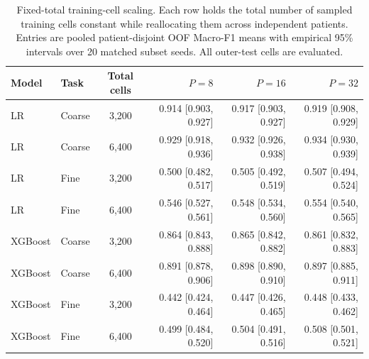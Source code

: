 \begin{table}[H]
\centering
\small
\setlength{\tabcolsep}{4pt}
\begin{tabular}{llcrrr}
\toprule
Model & Task & Total cells & $P=8$ & $P=16$ & $P=32$ \\
\midrule
LR & Coarse & 3,200 & 0.914 [0.903, 0.927] & 0.917 [0.903, 0.927] & 0.919 [0.908, 0.929] \\
LR & Coarse & 6,400 & 0.929 [0.918, 0.936] & 0.932 [0.926, 0.938] & 0.934 [0.930, 0.939] \\
LR & Fine & 3,200 & 0.500 [0.482, 0.517] & 0.505 [0.492, 0.519] & 0.507 [0.494, 0.524] \\
LR & Fine & 6,400 & 0.546 [0.527, 0.561] & 0.548 [0.534, 0.560] & 0.554 [0.540, 0.565] \\
\midrule
XGBoost & Coarse & 3,200 & 0.864 [0.843, 0.888] & 0.865 [0.842, 0.882] & 0.861 [0.832, 0.883] \\
XGBoost & Coarse & 6,400 & 0.891 [0.878, 0.906] & 0.898 [0.890, 0.910] & 0.897 [0.885, 0.911] \\
XGBoost & Fine & 3,200 & 0.442 [0.424, 0.464] & 0.447 [0.426, 0.465] & 0.448 [0.433, 0.462] \\
XGBoost & Fine & 6,400 & 0.499 [0.484, 0.520] & 0.504 [0.491, 0.516] & 0.508 [0.501, 0.521] \\
\midrule
\bottomrule
\end{tabular}
\caption{Fixed-total training-cell scaling. Each row holds the total number of sampled training cells constant while reallocating them across independent patients. Entries are pooled patient-disjoint OOF Macro-F1 means with empirical 95\% intervals over 20 matched subset seeds. All outer-test cells are evaluated.}
\label{tab:fixed_total_scaling}
\end{table}
